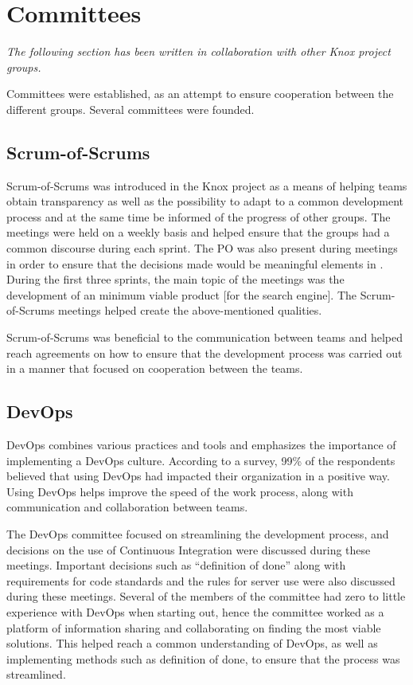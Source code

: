 \section{Committees}\label{SHARED-committees}
\textit{The following section has been written in collaboration with other Knox project groups.}

Committees were established, as an attempt to ensure cooperation between the different groups. Several committees were founded.

\subsection{Scrum-of-Scrums}
Scrum-of-Scrums was introduced in the Knox project as a means of helping teams obtain transparency as well as the possibility to adapt to a common development process and at the same time be informed of the progress of other groups\cite{agile}.
The meetings were held on a weekly basis and helped ensure that the groups had a common discourse during each sprint. 
The \knox{} PO was also present during meetings in order to ensure that the decisions made would be meaningful elements in \knox{}. 
During the first three sprints, the main topic of the meetings was the development of an minimum viable product [for the search engine].
The Scrum-of-Scrums meetings helped create the above-mentioned qualities.

Scrum-of-Scrums was beneficial to the communication between teams and helped reach agreements on how to ensure that the development process was carried out in a manner that focused on cooperation between the teams.

\subsection{DevOps}
DevOps combines various practices and tools and emphasizes the importance of implementing a DevOps culture. According to a survey, 99\% of the respondents believed that using DevOps had impacted their organization in a positive way\cite{Atlassian}. Using DevOps helps improve the speed of the work process, along with communication and collaboration between teams.

The DevOps committee focused on streamlining the development process, and decisions on the use of Continuous Integration were discussed during these meetings. 
Important decisions such as “definition of done” along with requirements for code standards and the rules for server use were also discussed during these meetings.
Several of the members of the committee had zero to little experience with DevOps when starting out, hence the committee worked as a platform of information sharing and collaborating on finding the most viable solutions. This helped reach a common understanding of DevOps, as well as implementing methods such as definition of done, to ensure that the process was streamlined.

